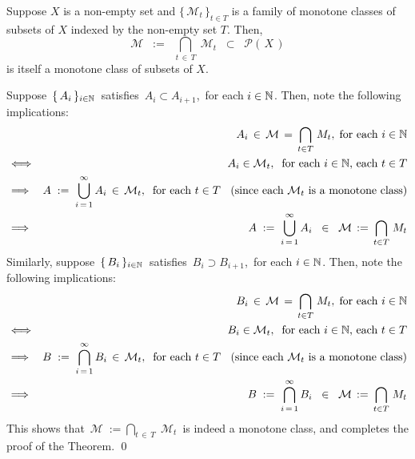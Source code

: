 \begin{theorem}
\label{ArbitraryIntersectionOfMonotoneClassesIsMonotoneClass}
\mbox{}\vskip0.1cm\noindent
Suppose $X$ is a non-empty set and $\{\,\mathcal{M}_{t}\,\}_{t\in T}$
is a family of monotone classes of subsets of $X$ indexed by the non-empty set $T$.
Then, 
\begin{equation*}
\mathcal{M} \;\; := \;\; \underset{t\,\in\,T}{\bigcap}\;\mathcal{M}_{t} \;\; \subset \;\; \mathcal{P}\!\left(\,X\,\right)
\end{equation*}
is itself a monotone class of subsets of $X$.
\end{theorem}
\proof
Suppose \,$\{\,A_{i}\,\}_{i\in\mathbb{N}}$\, satisfies \,$A_{i}\subset A_{i+1}$,\, for each $i \in \mathbb{N}$.
Then, note the following implications:
\begin{eqnarray*}
&&
	A_{i} \,\in\, \mathcal{M}\,=\,\underset{t\in T}{\bigcap}\;M_{t},\;\textnormal{for each $i \in \mathbb{N}$}
\\
&\Longleftrightarrow&
	A_{i} \in \mathcal{M}_{t},\;\;\textnormal{for each $i \in \mathbb{N}$, each $t \in T$}
\\
&\Longrightarrow&
	A \;:=\; \overset{\infty}{\underset{i\,=\,1}{\bigcup}}\, A_{i} \,\in\, \mathcal{M}_{t},
	\;\;\textnormal{for each $t \in T$ \;\;(since each $\mathcal{M}_{t}$ is a monotone class)}
\\
&\Longrightarrow&
	A \;:=\; \overset{\infty}{\underset{i\,=\,1}{\bigcup}}\, A_{i} \;\;\in\;\; \mathcal{M}\,:=\,\underset{t\in T}{\bigcap}\;M_{t}
\end{eqnarray*}
Similarly, suppose \,$\{\,B_{i}\,\}_{i\in\mathbb{N}}$\, satisfies \,$B_{i}\supset B_{i+1}$,\, for each $i \in \mathbb{N}$.
Then, note the following implications:
\begin{eqnarray*}
&&
	B_{i} \,\in\, \mathcal{M}\,=\,\underset{t\in T}{\bigcap}\;M_{t},\;\textnormal{for each $i \in \mathbb{N}$}
\\
&\Longleftrightarrow&
	B_{i} \in \mathcal{M}_{t},\;\;\textnormal{for each $i \in \mathbb{N}$, each $t \in T$}
\\
&\Longrightarrow&
	B \;:=\; \overset{\infty}{\underset{i\,=\,1}{\bigcap}}\, B_{i} \,\in\, \mathcal{M}_{t},
	\;\;\textnormal{for each $t \in T$ \;\;(since each $\mathcal{M}_{t}$ is a monotone class)}
\\
&\Longrightarrow&
	B \;:=\; \overset{\infty}{\underset{i\,=\,1}{\bigcap}}\, B_{i} \;\;\in\;\; \mathcal{M}\,:=\,\underset{t\in T}{\bigcap}\;M_{t}
\end{eqnarray*}
This shows that \,$\mathcal{M} \; := \underset{t\,\in\,T}{\bigcap}\;\mathcal{M}_{t}$\,
is indeed a monotone class, and completes the proof of the Theorem.
\qed

